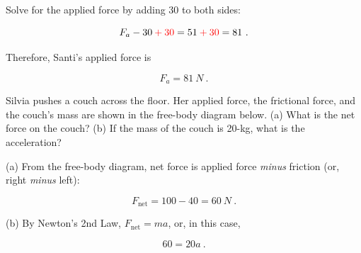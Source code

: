 \documentclass{article}
\numberwithin{equation}{section}
\numberwithin{figure}{section}
\begin{document}
Solve for the applied force by adding 30 to both sides:

\begin{equation*}
    F_a - 30 \mathbin{\textcolor{red}{+}} \textcolor{red}{30} 
    = 51 \mathbin{\textcolor{red}{+}} \textcolor{red}{30} = 81\ .
\end{equation*}

Therefore, Santi's applied force is

\begin{equation*}
    F_a = \SI{81}{N}\ .
\end{equation*}

\begin{example} \label{ex:SilviaCouch} 
Silvia pushes a couch across the floor. Her applied force, the frictional force, and the couch's mass are shown in the free-body diagram below. (a) What is the net force on the couch? (b) If the mass of the couch is 20-kg, what is the acceleration? 
\end{example}
\vspace{-1em}

\begin{figure}[h!]
    \centering
{}
\end{figure}


\Solution (a) From the free-body diagram, net force is applied force \textit{minus} friction (or, right \textit{minus} left):

\begin{equation*}
    F_{\text{net}} = 100 - 40 = \SI{60}{N}\ .
\end{equation*}


(b) By Newton's 2nd Law, $F_{\text{net}} = m a$, or, in this case,

\begin{equation*}
    60 = 20 a\ .
\end{equation*}
\end{document}
